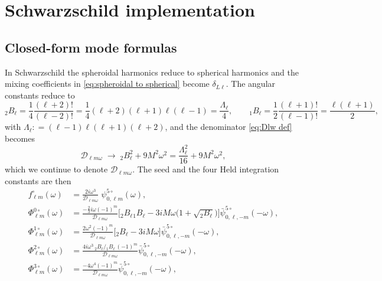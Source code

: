\documentclass[preprint,aps,nofootinbib,a4paper,superscriptaddress,longbibliography,amsfonts, amssymb,amsmath,titlepage]{revtex4-1}
\numberwithin{equation}{section} %
\newcommand{\emm}{m}
\def\l{\ensuremath{\ell}}
\newcommand{\Bco}[1]{{}_{#1}B_{\l}}                 %
\def\LamL{\Lambda_{\l}}                             %
\def\Dlw{\mathcal{D}_{\l\emm\omega}}                %
\def\fHo{f^{\circ}}
\newcommand{\PhiN}[1]{\Phi^{#1\circ}}
\newcommand{\psifiveM}[1]{\psi^{5\circ}_{0,#1}}       %
\def\defeq{\mathrel{\mathop{:}}=}
\begin{document}
\section{Schwarzschild implementation}
\label{sec:schw}

\subsection{Closed-form mode formulas}
\label{sec:schw closed form}
In Schwarzschild the spheroidal harmonics reduce to spherical harmonics and
the mixing coefficients in \eqref{eq:spheroidal to spherical} become
$\delta_{L\l}$.  The angular constants reduce to
\begin{equation}\label{eq:B schw}
\Bco{2} = \frac{1}{4}\frac{(\l+2)!}{(\l-2)!}
= \frac{1}{4}(\l+2)(\l+1)\l(\l-1) = \frac{\LamL}{4},
\qquad
\Bco{1} = \frac{1}{2}\frac{(\l+1)!}{(\l-1)!} = \frac{\l(\l+1)}{2},
\end{equation}
with $\LamL\defeq(\l-1)\l(\l+1)(\l+2)$, and the denominator
\eqref{eq:Dlw def} becomes
\begin{equation}\label{eq:D schw}
\Dlw \;\longrightarrow\; \Bco{2}^{2}+9M^{2}\omega^{2}
= \frac{\LamL^{2}}{16}+9M^{2}\omega^{2},
\end{equation}
which we continue to denote $\Dlw$.  The seed and the four Held integration
constants are then
\begin{subequations}\label{eq:schw closed form}
\begin{align}
\fHo_{\l\emm}(\omega)
&=
\frac{2i\omega^{3}}{\Dlw}\;\psifiveM{\l\emm}(\omega),
\label{eq:f schw}\\[4pt]
\PhiN{0}_{\l\emm}(\omega)
&=
\frac{-\tfrac23 i\omega(-1)^{\emm}}{\Dlw}
\Big[\Bco{2}\Bco{1}-3iM\omega\big(1+\sqrt{\Bco{2}}\big)\Big]
\bar\psi^{5\circ}_{0,\l,-\emm}(-\omega),
\label{eq:Phi0 schw}\\[4pt]
\PhiN{1}_{\l\emm}(\omega)
&=
\frac{2\omega^{2}(-1)^{\emm}}{\Dlw}
\big[\Bco{2}-3iM\omega\big]
\bar\psi^{5\circ}_{0,\l,-\emm}(-\omega),
\label{eq:Phi1 schw}\\[4pt]
\PhiN{2}_{\l\emm}(\omega)
&=
\frac{4i\omega^{3}\,\Bco{2}/\Bco{1}\,(-1)^{\emm}}{\Dlw}
\bar\psi^{5\circ}_{0,\l,-\emm}(-\omega),
\label{eq:Phi2 schw}\\[4pt]
\PhiN{3}_{\l\emm}(\omega)
&=
\frac{-4\omega^{4}(-1)^{\emm}}{\Dlw}
\bar\psi^{5\circ}_{0,\l,-\emm}(-\omega),
\label{eq:Phi3 schw}
\end{align}
\end{subequations}
\end{document}
